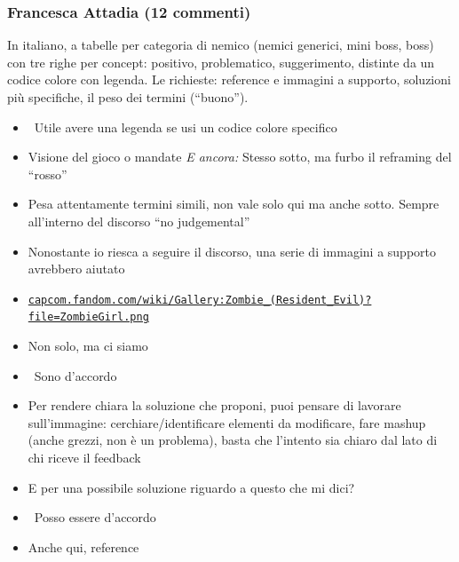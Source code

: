 \subsubsection{Francesca Attadia (12 commenti)}
In italiano, a tabelle per categoria di nemico (nemici generici, mini boss, boss) con tre righe per concept: positivo, problematico, suggerimento, distinte da un codice colore con legenda. Le richieste: reference e immagini a supporto, soluzioni più specifiche, il peso dei termini (``buono'').
{\small
\begin{itemize}
  \item {} \rvBene\ Utile avere una legenda se usi un codice colore specifico
  \item {} Visione del gioco o mandate \emph{E ancora:} Stesso sotto, ma furbo il reframing del ``rosso''
  \item {} Pesa attentamente termini simili, non vale solo qui ma anche sotto. Sempre all'interno del discorso ``no judgemental''
  \item {} Nonostante io riesca a seguire il discorso, una serie di immagini a supporto avrebbero aiutato
  \item {} \href{https://capcom.fandom.com/wiki/Gallery:Zombie_(Resident_Evil)?file=ZombieGirl.png}{\texttt{capcom.fandom.com/\allowbreak wiki/\allowbreak Gallery:\allowbreak Zombie\_(Resident\_Evil)?\allowbreak file=\allowbreak ZombieGirl.png}}
  \item {} Non solo, ma ci siamo
  \item {} \rvBene\ Sono d'accordo
  \item {} Per rendere chiara la soluzione che proponi, puoi pensare di lavorare sull'immagine: cerchiare/identificare elementi da modificare, fare mashup (anche grezzi, non è un problema), basta che l'intento sia chiaro dal lato di chi riceve il feedback
  \item {} E per una possibile soluzione riguardo a questo che mi dici?
  \item {} \rvBene\ Posso essere d'accordo
  \item {} Anche qui, reference
\end{itemize}
}

